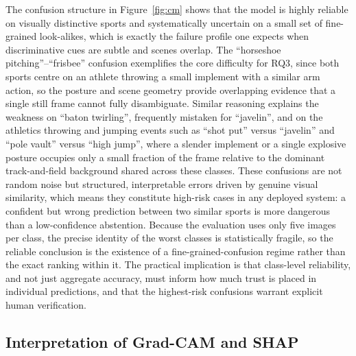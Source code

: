 The confusion structure in Figure~\ref{fig:cm} shows that the model is highly reliable on visually distinctive sports and systematically uncertain on a small set of fine-grained look-alikes, which is exactly the failure profile one expects when discriminative cues are subtle and scenes overlap.
The ``horseshoe pitching''--``frisbee'' confusion exemplifies the core difficulty for RQ3, since both sports centre on an athlete throwing a small implement with a similar arm action, so the posture and scene geometry provide overlapping evidence that a single still frame cannot fully disambiguate.
Similar reasoning explains the weakness on ``baton twirling'', frequently mistaken for ``javelin'', and on the athletics throwing and jumping events such as ``shot put'' versus ``javelin'' and ``pole vault'' versus ``high jump'', where a slender implement or a single explosive posture occupies only a small fraction of the frame relative to the dominant track-and-field background shared across these classes.
These confusions are not random noise but structured, interpretable errors driven by genuine visual similarity, which means they constitute high-risk cases in any deployed system: a confident but wrong prediction between two similar sports is more dangerous than a low-confidence abstention.
Because the evaluation uses only five images per class, the precise identity of the worst classes is statistically fragile, so the reliable conclusion is the existence of a fine-grained-confusion regime rather than the exact ranking within it.
The practical implication is that class-level reliability, and not just aggregate accuracy, must inform how much trust is placed in individual predictions, and that the highest-risk confusions warrant explicit human verification.

\subsection{Interpretation of Grad-CAM and SHAP}
\label{subsec:disc-xai}

